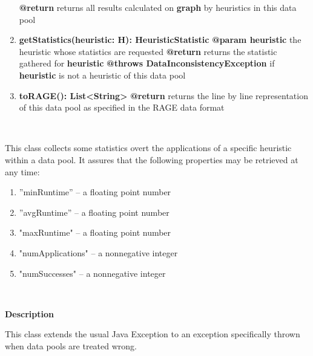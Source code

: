 \begin{enumerate}[+]
{			\textbf{@return} returns all results calculated on \textbf{graph} by heuristics in this data pool
		}
		~\newpage
		\item{
			\textbf{getStatistics(heuristic: H): HeuristicStatistic} \newline
			\textbf{@param heuristic} the heuristic whose statistics are requested \newline
			\textbf{@return} returns the statistic gathered for \textbf{heuristic} \newline
			\textbf{@throws DataInconsistencyException} if \textbf{heuristic} is not a heuristic of this data pool
		}
		\item{
			\textbf{toRAGE(): List<String>} \newline
			\textbf{@return} returns the line by line representation of this data pool as specified in the RAGE data format
		}
	\end{enumerate}
	
	~\newline
	~\newline
	~\newline
	
	
	This class collects some statistics overt the applications of a specific heuristic within a data pool. It assures that the following properties may be retrieved at any time:
	
	\begin{enumerate}[--]
		\item{''minRuntime'' -- a floating point number}
		\item{''avgRuntime'' -- a floating point number}
		\item{"maxRuntime" -- a floating point number}
		\item{"numApplications" -- a nonnegative integer}
		\item{"numSuccesses" -- a nonnegative integer}
	\end{enumerate}
	
	~\newline
	~\newline
	~\newline
	
	
	\textbf{Description}
	
	This class extends the usual Java Exception to an exception specifically thrown when data pools are treated wrong.
	
	~\newpage
	
